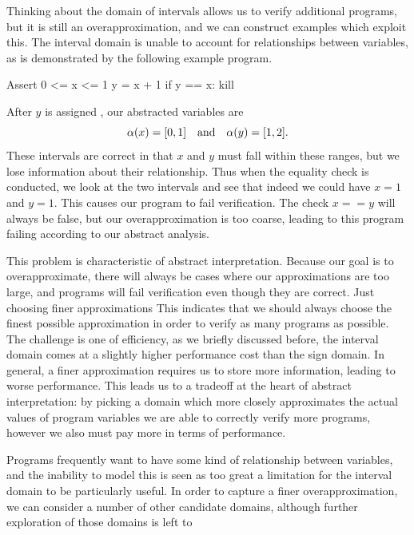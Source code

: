 Thinking about the domain of intervals allows us to verify additional programs, but it is still an overapproximation, and we can construct examples which exploit this.
The interval domain is unable to account for relationships between variables, as is demonstrated by the following example program.
\begin{code}
Assert 0 <= x <= 1
y = x + 1
if y == x:
  kill
\end{code}
After $y$ is assigned , our abstracted variables are
\[\alpha(x) = [0, 1]\quad \text{and} \quad \alpha(y) = [1, 2] .\]
These intervals are correct in that $x$ and $y$ must fall within these ranges, but we lose information about their relationship.
Thus when the equality check  is conducted, we look at the two intervals and see that indeed we could have $x = 1$ and $y = 1$.
This causes our program to fail verification.
The check $x == y$ will always be false, but our overapproximation is too coarse, leading to this program failing according to our abstract analysis.

This problem is characteristic of abstract interpretation. 
Because our goal is to overapproximate, there will always be cases where our approximations are too large, and programs will fail verification even though they are correct.
Just choosing finer approximations 
This indicates that we should always choose the finest possible approximation in order to verify as many programs as possible.
The challenge is one of efficiency, as we briefly discussed before, the interval domain comes at a slightly higher performance cost than the sign domain.
In general, a finer approximation requires us to store more information, leading to worse performance.
This leads us to a tradeoff at the heart of abstract interpretation: by picking a domain which more closely approximates the actual values of program variables we are able to correctly verify more programs, however we also must pay more in terms of performance.

Programs frequently want to have some kind of relationship between variables, and the inability to model this is seen as too great a limitation for the interval domain to be particularly useful.
In order to capture a finer overapproximation, we can consider a number of other candidate domains, although further exploration of those domains is left to 
